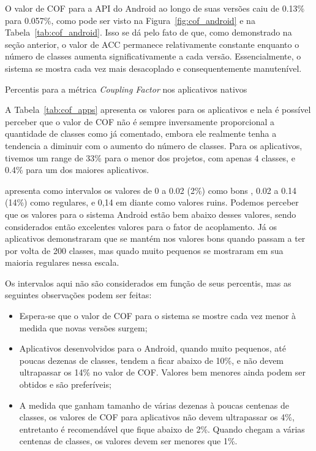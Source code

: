 
O valor de COF para a API do Android ao longo de suas versões caiu de 0.13\% para 0.057\%, como pode ser visto na Figura~\ref{fig:cof_android} e na Tabela~\ref{tab:cof_android}. Isso se dá pelo fato de que, como demonstrado na seção anterior, o valor de ACC permanece relativamente constante enquanto o número de classes aumenta significativamente a cada versão. Essencialmente, o sistema se mostra cada vez mais desacoplado e consequentemente manutenível. 

\begin{table}[!htb]
\begin{center}

\caption{Percentis para a métrica \textit{Coupling Factor} nos aplicativos nativos}
\label{tab:cof_apps}
\end{center}
\end{table}

A Tabela~\ref{tab:cof_apps} apresenta os valores para os aplicativos e nela é possível perceber que o valor de COF não é sempre inversamente proporcional a quantidade de classes como já comentado, embora ele realmente tenha a tendencia a diminuir com o aumento do número de classes. Para os aplicativos, tivemos um range de 33\% para o menor dos projetos, com apenas 4 classes, e 0.4\% para um dos maiores aplicativos.

 apresenta como intervalos os valores de 0 a 0.02 (2\%) como bons , 0.02 a 0.14 (14\%) como regulares, e 0,14 em diante como valores ruins. Podemos perceber que os valores para o sistema Android estão bem abaixo desses valores, sendo considerados então excelentes valores para o fator de acoplamento. Já os aplicativos demonstraram que se mantém nos valores bons quando passam a ter por volta de 200 classes, mas quado muito pequenos se mostraram em sua maioria regulares nessa escala. 

Os intervalos aqui não são considerados em função de seus percentis, mas as seguintes observações podem ser feitas:

\begin{itemize}
\item Espera-se que o valor de COF para o sistema se mostre cada vez menor à medida que novas versões surgem;
\item Aplicativos desenvolvidos para o Android, quando muito pequenos, até poucas dezenas de classes, tendem a ficar abaixo de 10\%, e não devem ultrapassar os 14\% no valor de COF. Valores bem menores ainda podem ser obtidos e são preferíveis;
\item A medida que ganham tamanho de várias dezenas à poucas centenas de classes, os valores de COF para aplicativos não devem ultrapassar os 4\%, entretanto é recomendável que fique abaixo de 2\%. Quando chegam a várias centenas de classes, os valores devem ser menores que 1\%.
\end{itemize}

